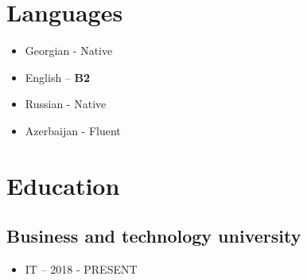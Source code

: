 \documentclass[]{article}
\begin{document}
\section{Languages}\label{languages}

\begin{itemize}
\item
  Georgian - Native
\item
  English -- \textbf{B2}
\item
  Russian - Native
\item
  Azerbaijan - Fluent
\end{itemize}

\section{Education}\label{education}

\subsection{Business and technology
university~}\label{business-and-technology-university}

\begin{itemize}
\item
  IT -- 2018 - PRESENT
\end{itemize}
\end{document}
